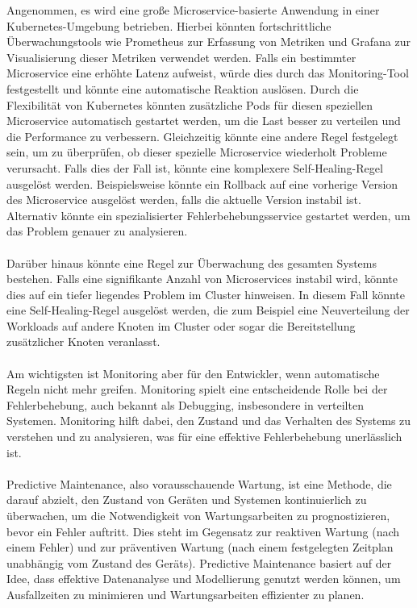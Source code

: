 Angenommen, es wird eine große Microservice-basierte Anwendung in einer Kubernetes-Umgebung betrieben. Hierbei könnten fortschrittliche Überwachungstools wie Prometheus zur Erfassung von Metriken und Grafana zur Visualisierung dieser Metriken verwendet werden. Falls ein bestimmter Microservice eine erhöhte Latenz aufweist, würde dies durch das Monitoring-Tool festgestellt und könnte eine automatische Reaktion auslösen. Durch die Flexibilität von Kubernetes könnten zusätzliche Pods für diesen speziellen Microservice automatisch gestartet werden, um die Last besser zu verteilen und die Performance zu verbessern.
Gleichzeitig könnte eine andere Regel festgelegt sein, um zu überprüfen, ob dieser spezielle Microservice wiederholt Probleme verursacht. Falls dies der Fall ist, könnte eine komplexere Self-Healing-Regel ausgelöst werden. Beispielsweise könnte ein Rollback auf eine vorherige Version des Microservice ausgelöst werden, falls die aktuelle Version instabil ist. Alternativ könnte ein spezialisierter Fehlerbehebungsservice gestartet werden, um das Problem genauer zu analysieren.
\\\\
Darüber hinaus könnte eine Regel zur Überwachung des gesamten Systems bestehen. Falls eine signifikante Anzahl von Microservices instabil wird, könnte dies auf ein tiefer liegendes Problem im Cluster hinweisen. In diesem Fall könnte eine Self-Healing-Regel ausgelöst werden, die zum Beispiel eine Neuverteilung der Workloads auf andere Knoten im Cluster oder sogar die Bereitstellung zusätzlicher Knoten veranlasst.
\\\\
Am wichtigsten ist Monitoring aber für den Entwickler, wenn automatische Regeln nicht mehr greifen. Monitoring spielt eine entscheidende Rolle bei der Fehlerbehebung, auch bekannt als Debugging, insbesondere in verteilten Systemen. Monitoring hilft dabei, den Zustand und das Verhalten des Systems zu verstehen und zu analysieren, was für eine effektive Fehlerbehebung unerlässlich ist.
\\\\
Predictive Maintenance, also vorausschauende Wartung, ist eine Methode, die darauf abzielt, den Zustand von Geräten und Systemen kontinuierlich zu überwachen, um die Notwendigkeit von Wartungsarbeiten zu prognostizieren, bevor ein Fehler auftritt. Dies steht im Gegensatz zur reaktiven Wartung (nach einem Fehler) und zur präventiven Wartung (nach einem festgelegten Zeitplan unabhängig vom Zustand des Geräts). Predictive Maintenance basiert auf der Idee, dass effektive Datenanalyse und Modellierung genutzt werden können, um Ausfallzeiten zu minimieren und Wartungsarbeiten effizienter zu planen.
